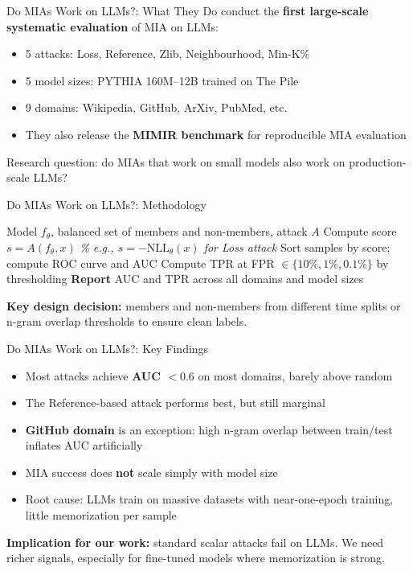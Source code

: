 \documentclass[10pt, aspectratio=169]{beamer}
\newcommand{\NLL}{\mathrm{NLL}}
\begin{document}
\begin{frame}{Do MIAs Work on LLMs?: What They Do}
  \citet{duan2024mimir} conduct the \textbf{first large-scale systematic evaluation} of MIA on LLMs:
  \begin{itemize}
    \item 5 attacks: Loss, Reference, Zlib, Neighbourhood, Min-K\%
    \item 5 model sizes: PYTHIA 160M–12B trained on The Pile
    \item 9 domains: Wikipedia, GitHub, ArXiv, PubMed, etc.
    \item They also release the \textbf{MIMIR benchmark} for reproducible MIA evaluation
  \end{itemize}
  \vspace{8pt}
  Research question: do MIAs that work on small models also work on production-scale LLMs?
\end{frame}

\begin{frame}{Do MIAs Work on LLMs?: Methodology}
  \begin{algorithmic}[1]
    \Require Model $f_\theta$, balanced set of members and non-members, attack $A$
      \State Compute score $s = A(f_\theta, x)$
      \quad \textit{\% e.g., $s = -\NLL_\theta(x)$ for Loss attack}
    \EndFor
    \State Sort samples by score; compute ROC curve and AUC
    \State Compute TPR at FPR $\in \{10\%, 1\%, 0.1\%\}$ by thresholding
    \State \textbf{Report} AUC and TPR across all domains and model sizes
  \end{algorithmic}
  \vspace{8pt}
  \textbf{Key design decision:} members and non-members from different time splits or n-gram overlap thresholds to ensure clean labels.
\end{frame}

\begin{frame}{Do MIAs Work on LLMs?: Key Findings}
  \begin{itemize}
    \item Most attacks achieve \textbf{AUC $< 0.6$} on most domains, barely above random
    \item The Reference-based attack performs best, but still marginal
    \item \textbf{GitHub domain} is an exception: high n-gram overlap between train/test inflates AUC artificially
    \item MIA success does \textbf{not} scale simply with model size
    \item Root cause: LLMs train on massive datasets with near-one-epoch training, little memorization per sample
  \end{itemize}
  \vspace{8pt}
  \textbf{Implication for our work:} standard scalar attacks fail on LLMs. We need richer signals, especially for fine-tuned models where memorization is strong.
\end{frame}
\end{document}
